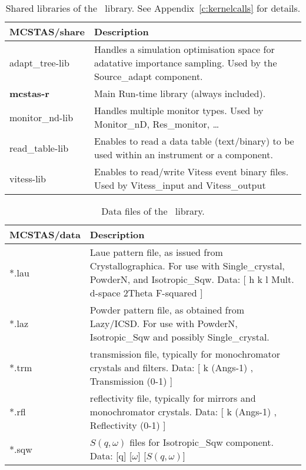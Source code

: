 \begin{table}
  \begin{center}
    {\let\my=\\
    \begin{tabular}{|p{}|p{}|}
      \hline
       {\bf MCSTAS/share} & Description \\
       \hline
       adapt\_tree-lib  & Handles a simulation optimisation space for
       adatative importance sampling.
                          Used by the Source\_adapt component. \\
       {\bf mcstas-r}      &   Main Run-time library (always included). \\
       monitor\_nd-lib & Handles multiple monitor types.
                        Used by Monitor\_nD, Res\_monitor, \ldots \\
       read\_table-lib  & Enables to read a data table (text/binary) to be used within
                          an instrument or a component. \\
       vitess-lib &     Enables to read/write Vitess event binary files.
                        Used by Vitess\_input and Vitess\_output \\
      \hline
    \end{tabular}
    \caption{Shared libraries of the \MCS\ library. See Appendix~\ref{c:kernelcalls} for details.}
    \label{t:comp-share}
    }
  \end{center}
\end{table}

\begin{table}
  \begin{center}
    {\let\my=\\
    \begin{tabular}{|p{}|p{}|}
      \hline
       {\bf MCSTAS/data} & Description \\
       \hline
 *.lau & Laue pattern file, as issued from Crystallographica.
       For use with Single\_crystal, PowderN, and Isotropic\_Sqw.
       Data: [ h   k   l Mult. d-space 2Theta   F-squared ] \\
 *.laz & Powder pattern file, as obtained from Lazy/ICSD.
       For use with PowderN, Isotropic\_Sqw and possibly Single\_crystal.\\
 *.trm & transmission file, typically for monochromator crystals and filters.
       Data: [ k (Angs-1) , Transmission (0-1) ] \\
 *.rfl & reflectivity file, typically for mirrors and monochromator crystals.
       Data: [ k (Angs-1) , Reflectivity (0-1) ] \\
 *.sqw & $S(q,\omega)$ files for Isotropic\_Sqw component.
       Data: [q] [$\omega$] [$S(q,\omega)$]\\
      \hline
    \end{tabular}
    \caption{Data files of the \MCS\ library.}
    \label{t:comp-data}
    }
  \end{center}
\end{table}

